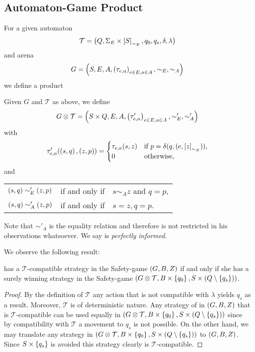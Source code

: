 \subsection{Automaton-Game Product}
For a given automaton
\begin{equation*}
  \mathcal{T} = \left(Q, \Sigma_{E}\times \left[S\right]_{\sim_{E}}, q_{0}, 
  q_{s}, \delta, \lambda\right)
\end{equation*}
and arena 
\begin{equation*}
  G = \left(S, E, A, \left(\tau_{e, a}\right)_{e\in E, a\in A}, \sim_{E}, \sim_{A}\right)
\end{equation*}
we define a product
\begin{definition}
  Given $G$ and $\mathcal{T}$ as above, we define
  \begin{equation*}
    G\otimes\mathcal{T} = \left(S\times Q, E, A, 
    \left(\tau'_{e, a}\right)_{e\in E, a\in A}, \sim'_{E}, \sim'_{A}\right)
  \end{equation*}
  with
  \begin{equation*}
    \tau'_{e, a}(\left(s,q\right), \left(z,p\right)) = \begin{cases}
      \tau_{e, a}(s, z)&\text{if }p = \delta(q, (e,\left[z\right]_{\sim_{E}})),\\
      0&\text{otherwise},
    \end{cases}
  \end{equation*}
  and
  \begin{center}
    \begin{tabular}{lll}
      $\left(s, q\right)\sim'_{E}\left(z, p\right)$& if and only if & $s\sim_{A} z$ and 
        $q = p$,\\
      $\left(s, q\right)\sim'_{A}\left(z, p\right)$& if and only if & $s = z, q = p$.
    \end{tabular}
  \end{center}
  Note that $\sim'_{A}$ is the equality relation and therefore \adam{} is not
  restricted in his observations whatsoever. We say \adam{} is 
  \emph{perfectly informed}.
\end{definition}
We observe the following result:
\begin{lemma}
  \eve{} has a $\mathcal{T}$-compatible strategy in the Safety-game
  $\left(G, B, Z\right)$ if and only if she has a surely winning
  strategy in the Safety-game 
  $\left(G\otimes\mathcal{T}, B\times\left\{q_{0}\right\}, 
    S\times\left(Q\setminus\left\{q_{s}\right\}\right)\right)$.
\end{lemma}
\begin{proof}
  By the definition of $\mathcal{T}$ any action that is not compatible with 
  $\lambda$ yields $q_{s}$ as a result. Moreover, $\mathcal{T}$ is of
  deterministic nature. Any strategy of \eve{} in $\left(G, B, Z\right)$ that is
  $\mathcal{T}$-compatible can be used equally in 
  $\left(G\otimes\mathcal{T}, B\times\left\{q_{0}\right\}, 
    S\times\left(Q\setminus\left\{q_{s}\right\}\right)\right)$ since by compatibility with 
  $\mathcal{T}$ a movement to $q_{s}$ is not possible. On the other hand, we 
  may translate any strategy in $\left(G\otimes\mathcal{T}, 
  B\times\left\{q_{0}\right\}, S\times\left(Q\setminus\left\{q_{s}\right\}\right)\right)$ to 
  $\left(G, B, Z\right)$. Since $S\times\left\{q_{s}\right\}$ is avoided this strategy 
  clearly is $\mathcal{T}$-compatible.
\end{proof}
